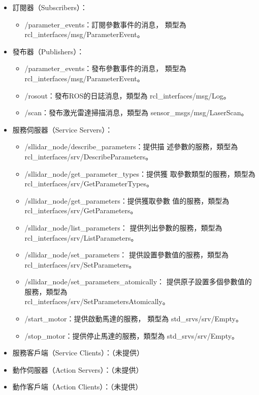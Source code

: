\begin{itemize}
    \item 訂閱器（Subscribers）：
        \begin{itemize}
            \item /parameter\_events：訂閱參數事件的消息，
                類型為 rcl\_interfaces/msg/ParameterEvent。
        \end{itemize}
    \item 發布器（Publishers）：

        \begin{itemize}
            \item /parameter\_events：發布參數事件的消息，
                類型為 rcl\_interfaces/msg/ParameterEvent。
            \item /rosout：發布ROS的日誌消息，類型為 
                rcl\_interfaces/msg/Log。
            \item /scan：發布激光雷達掃描消息，類型為 
                sensor\_msgs/msg/LaserScan。
        \end{itemize}
    \item 服務伺服器（Service Servers）：
        \begin{itemize}
            \item /sllidar\_node/describe\_parameters：提供描
                述參數的服務，類型為 \\
                rcl\_interfaces/srv/DescribeParameters。
            \item /sllidar\_node/get\_parameter\_types：提供獲
                取參數類型的服務，類型為 \\
                rcl\_interfaces/srv/GetParameterTypes。
            \item /sllidar\_node/get\_parameters：提供獲取參數
                值的服務，類型為 \\
                rcl\_interfaces/srv/GetParameters。
            \item /sllidar\_node/list\_parameters：
                提供列出參數的服務，類型為\\
                rcl\_interfaces/srv/ListParameters。
            \item /sllidar\_node/set\_parameters：
                提供設置參數值的服務，類型為 \\
                rcl\_interfaces/srv/SetParameters。
            \item /sllidar\_node/set\_parameters\_atomically：
                提供原子設置多個參數值的服務，類型為 \\
                rcl\_interfaces/srv/SetParametersAtomically。
            \item /start\_motor：提供啟動馬達的服務，
                類型為 std\_srvs/srv/Empty。
            \item /stop\_motor：提供停止馬達的服務，類型為 
                std\_srvs/srv/Empty。
        \end{itemize}
    \item 服務客戶端（Service Clients）：（未提供）
    \item 動作伺服器（Action Servers）：（未提供）
    \item 動作客戶端（Action Clients）：（未提供）
\end{itemize}

